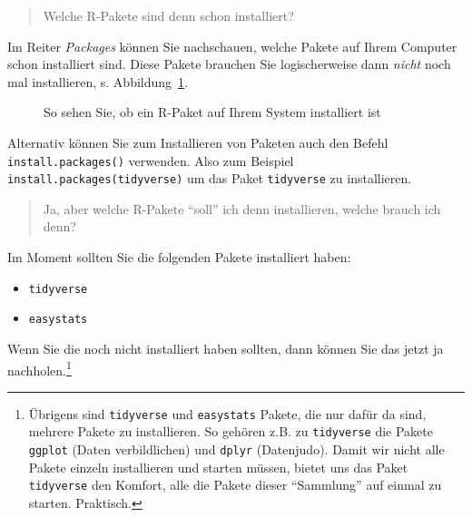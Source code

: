 \documentclass[
  a4paper,
  DIV=11]{scrreprt}
\providecommand{\tightlist}{%
  \setlength{\itemsep}{0pt}\setlength{\parskip}{0pt}}\usepackage{longtable,booktabs,array}
\theoremstyle{definition}
\theoremstyle{definition}
\theoremstyle{definition}
\theoremstyle{remark}
\begin{document}
\begin{quote}
{} Welche R-Pakete sind denn schon installiert?
\end{quote}

Im Reiter \emph{Packages} können Sie nachschauen, welche Pakete auf
Ihrem Computer schon installiert sind. Diese Pakete brauchen Sie
logischerweise dann \emph{nicht} noch mal installieren, s.
Abbildung~\ref{fig-paket-installiert}.

\begin{figure}


\caption{\label{fig-paket-installiert}So sehen Sie, ob ein R-Paket auf
Ihrem System installiert ist}

\end{figure}%

Alternativ können Sie zum Installieren von Paketen auch den Befehl
\texttt{install.packages()} verwenden. Also zum Beispiel
\texttt{install.packages(tidyverse)} um das Paket \texttt{tidyverse} zu
installieren.

\begin{quote}
{} Ja, aber welche R-Pakete ``soll'' ich denn
installieren, welche brauch ich denn?
\end{quote}

Im Moment sollten Sie die folgenden Pakete installiert haben:

\begin{itemize}
\tightlist
\item
  \texttt{tidyverse}
\item
  \texttt{easystats}
\end{itemize}

Wenn Sie die noch nicht installiert haben sollten, dann können Sie das
jetzt ja nachholen.\footnote{Übrigens sind \texttt{tidyverse} und
  \texttt{easystats} Pakete, die nur dafür da sind, mehrere Pakete zu
  installieren. So gehören z.B. zu \texttt{tidyverse} die Pakete
  \texttt{ggplot} (Daten verbildlichen) und \texttt{dplyr} (Datenjudo).
  Damit wir nicht alle Pakete einzeln installieren und starten müssen,
  bietet uns das Paket \texttt{tidyverse} den Komfort, alle die Pakete
  dieser ``Sammlung'' auf einmal zu starten. Praktisch.}
\end{document}
